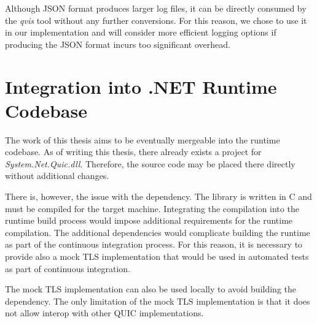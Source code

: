 Although JSON format produces larger log files, it can be directly consumed by the \textit{qvis}
tool without any further conversions. For this reason, we chose to use it in our implementation and
will consider more efficient logging options if producing the JSON format incurs too significant
overhead.

\section{Integration into .NET Runtime Codebase}

The work of this thesis aims to be eventually mergeable into the \dotnet{} runtime codebase. As of
writing this thesis, there already exists a project for \textit{System.Net.Quic.dll}. Therefore, the
source code may be placed there directly without additional changes.

There is, however, the issue with the \libopenssl{} dependency. The \libopenssl{} library is written
in C and must be compiled for the target machine. Integrating the \libopenssl{} compilation into the
\dotnet{} runtime build process would impose additional requirements for the \dotnet{} runtime
compilation. The additional dependencies would complicate building the \dotnet{} runtime as part of
the continuous integration process. For this reason, it is necessary to provide also a mock TLS
implementation that would be used in automated tests as part of continuous integration.

The mock TLS implementation can also be used locally to avoid building the \libopenssl{} dependency.
The only limitation of the mock TLS implementation is that it does not allow interop with other QUIC
implementations.
